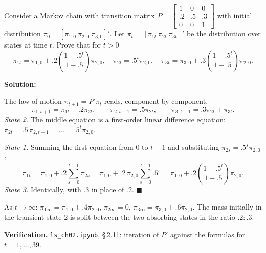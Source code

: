 \documentclass[12pt, letterpaper]{article}
\newcommand{\nb}[1]{\texttt{ls\_ch02.ipynb}, \S\,#1}
\begin{document}
\begin{tcolorbox}[oddbox,title={Exercise 2.11 \quad Transient Distribution of an Absorbing Chain}]
\begin{tcolorbox}[questionbox]
Consider a Markov chain with transition matrix
$P=\begin{bmatrix}1&0&0\\.2&.5&.3\\0&0&1\end{bmatrix}$ with initial distribution
$\pi_0=[\pi_{1,0}\ \pi_{2,0}\ \pi_{3,0}]'$. Let $\pi_t=[\pi_{1t}\ \pi_{2t}\ \pi_{3t}]'$ be the distribution
over states at time $t$. Prove that for $t>0$
\[
\pi_{1t}=\pi_{1,0}+.2\left(\frac{1-.5^t}{1-.5}\right)\pi_{2,0},\quad
\pi_{2t}=.5^t\pi_{2,0},\quad
\pi_{3t}=\pi_{3,0}+.3\left(\frac{1-.5^t}{1-.5}\right)\pi_{2,0}.
\]
\end{tcolorbox}

\textbf{Solution:}

The law of motion $\pi_{t+1}=P'\pi_t$ reads, component by component,
\[
\pi_{1,t+1}=\pi_{1t}+.2\pi_{2t},\qquad \pi_{2,t+1}=.5\pi_{2t},\qquad \pi_{3,t+1}=.3\pi_{2t}+\pi_{3t}.
\]
\emph{State 2.} The middle equation is a first-order linear difference equation:
$\pi_{2t}=.5\,\pi_{2,t-1}=\dots=.5^t\pi_{2,0}$.

\emph{State 1.} Summing the first equation from $0$ to $t-1$ and substituting $\pi_{2s}=.5^s\pi_{2,0}$:
\[
\pi_{1t}=\pi_{1,0}+.2\sum_{s=0}^{t-1}\pi_{2s}=\pi_{1,0}+.2\,\pi_{2,0}\sum_{s=0}^{t-1}.5^s
=\pi_{1,0}+.2\left(\frac{1-.5^t}{1-.5}\right)\pi_{2,0}.
\]
\emph{State 3.} Identically, with $.3$ in place of $.2$. $\blacksquare$

As $t\to\infty$: $\pi_{1\infty}=\pi_{1,0}+.4\pi_{2,0}$, $\pi_{2\infty}=0$,
$\pi_{3\infty}=\pi_{3,0}+.6\pi_{2,0}$. The mass initially in the transient state 2 is split between
the two absorbing states in the ratio $.2:.3$.

\textbf{Verification.} \nb{2.11}: iteration of $P'$ against the formulas for $t=1,\dots,39$. \checkmark
\end{tcolorbox}
\end{document}
